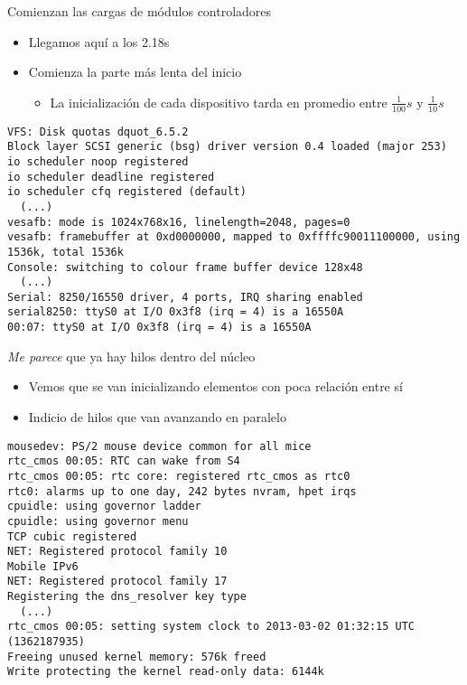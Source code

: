 \documentclass[presentation]{beamer}
\begin{document}
\begin{frame}[label={sec:org6dd650c},fragile]{Comienzan las cargas de módulos controladores}
 \begin{itemize}
\item Llegamos aquí a los 2.18s
\item Comienza la parte más lenta del inicio
\begin{itemize}
\item La inicialización de cada dispositivo tarda en promedio entre
\(\frac{1}{100}s\) y \(\frac{1}{10}s\)
\end{itemize}
\end{itemize}
\begin{verbatim}
VFS: Disk quotas dquot_6.5.2
Block layer SCSI generic (bsg) driver version 0.4 loaded (major 253)
io scheduler noop registered
io scheduler deadline registered
io scheduler cfq registered (default)
  (...)
vesafb: mode is 1024x768x16, linelength=2048, pages=0
vesafb: framebuffer at 0xd0000000, mapped to 0xffffc90011100000, using 1536k, total 1536k
Console: switching to colour frame buffer device 128x48
  (...)
Serial: 8250/16550 driver, 4 ports, IRQ sharing enabled
serial8250: ttyS0 at I/O 0x3f8 (irq = 4) is a 16550A
00:07: ttyS0 at I/O 0x3f8 (irq = 4) is a 16550A
\end{verbatim}
\end{frame}

\begin{frame}[label={sec:org120af62},fragile]{\emph{Me parece} que ya hay hilos dentro del núcleo}
 \begin{itemize}
\item Vemos que se van inicializando elementos con poca relación entre sí
\item Indicio de hilos que van avanzando en paralelo
\end{itemize}
\begin{verbatim}
mousedev: PS/2 mouse device common for all mice
rtc_cmos 00:05: RTC can wake from S4
rtc_cmos 00:05: rtc core: registered rtc_cmos as rtc0
rtc0: alarms up to one day, 242 bytes nvram, hpet irqs
cpuidle: using governor ladder
cpuidle: using governor menu
TCP cubic registered
NET: Registered protocol family 10
Mobile IPv6
NET: Registered protocol family 17
Registering the dns_resolver key type
  (...)
rtc_cmos 00:05: setting system clock to 2013-03-02 01:32:15 UTC (1362187935)
Freeing unused kernel memory: 576k freed
Write protecting the kernel read-only data: 6144k
\end{verbatim}
\end{frame}
\end{document}
